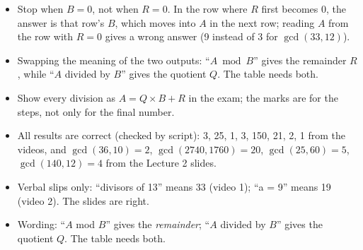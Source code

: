\begin{trap}
\begin{itemize}[leftmargin=1.5em]
  \item Stop when $B = 0$, not when $R = 0$. In the row where $R$ first becomes 0, the answer is that row's $B$, which moves into $A$ in the next row; reading $A$ from the row with $R = 0$ gives a wrong answer (9 instead of 3 for $\gcd(33, 12)$).
  \item Swapping the meaning of the two outputs: ``$A \bmod B$'' gives the remainder $R$, while ``$A$ divided by $B$'' gives the quotient $Q$. The table needs both.
  \item Show every division as $A = Q \times B + R$ in the exam; the marks are for the steps, not only for the final number.
\end{itemize}
\end{trap}

\begin{fixbox}
\begin{itemize}
  \item All results are correct (checked by script): 3, 25, 1, 3, 150, 21, 2, 1 from the videos, and $\gcd(36, 10) = 2$, $\gcd(2740, 1760) = 20$, $\gcd(25, 60) = 5$, $\gcd(140, 12) = 4$ from the Lecture 2 slides.
  \item Verbal slips only: ``divisors of 13'' means 33 (video 1); ``a = 9'' means 19 (video 2). The slides are right.
  \item Wording: ``$A$ mod $B$'' gives the \emph{remainder}; ``$A$ divided by $B$'' gives the quotient $Q$. The table needs both.
\end{itemize}
\end{fixbox}
